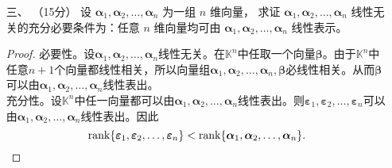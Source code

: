 \begin{enumerate}[1~]
\begin{proof}
\begin{align}
\begin{matrix}
\end{matrix} \right|\\
&=(x-y)D_{n-1}+y(x-z)^{n-1}\quad (n\ge 2).
\end{align}
由对称性，
\begin{equation}\label{Dn2}
D _ { n } = \left| A ^ { \prime } \right| = ( x - z ) D _ { n - 1 } + z ( x - y ) ^ { n - 1 } \quad ( n \ge 2 ).
\end{equation}
由 \eqref{Dn1} 和  \eqref{Dn2} 得，\[
D_n=\frac{y(x-z)^n-z(x-y)^n}{y-z}\quad (n\ge 2).
\]
容易验证上式在$n=1$时也成立。因此，\[
D_n=\frac{y(x-z)^n-z(x-y)^n}{y-z}.
\]
\end{proof}

\item[三、]（15分）
设 $\boldsymbol { \boldsymbol{\alpha} }_1, \boldsymbol { \boldsymbol{\alpha} }_2, \dots , \boldsymbol { \boldsymbol{\alpha} }_n$ 为一组 $n$ 维向量， 求证 $\boldsymbol { \boldsymbol{\alpha} }_1, \boldsymbol { \boldsymbol{\alpha} }_2, \dots ,\boldsymbol { \boldsymbol{\alpha} }_n$ 线性无关的充分必要条件为：任意 $n$ 维向量均可由 $\boldsymbol { \boldsymbol{\alpha} }_1, \boldsymbol { \boldsymbol{\alpha} }_2, \dots ,\boldsymbol { \boldsymbol{\alpha} }_n $ 线性表示。
\begin{proof}
必要性。设$\boldsymbol { \boldsymbol{\alpha} } _ { 1 } , \boldsymbol { \boldsymbol{\alpha} } _ { 2 } , \dots , \boldsymbol { \boldsymbol{\alpha} } _ { n }$线性无关。在$\mathbb{K}^n$中任取一个向量$\boldsymbol{\boldsymbol{\beta}}$。由于$\mathbb{K}^n$中任意$n+1$个向量都线性相关，所以向量组$\boldsymbol { \boldsymbol{\alpha} } _ { 1 } , \boldsymbol { \boldsymbol{\alpha} } _ { 2 } , \dots , \boldsymbol { \boldsymbol{\alpha} } _ { n } , \boldsymbol { \boldsymbol{\beta} }$必线性相关。从而$\boldsymbol { \boldsymbol{\beta} }$可以由$\boldsymbol { \boldsymbol{\alpha} } _ { 1 } , \boldsymbol { \boldsymbol{\alpha} } _ { 2 } , \dots , \boldsymbol { \boldsymbol{\alpha} } _ { n } $线性表出。\\
充分性。设$\mathbb{K}^n$中任一向量都可以由$\boldsymbol { \boldsymbol{\alpha} } _ { 1 } , \boldsymbol { \boldsymbol{\alpha} } _ { 2 } , \dots , \boldsymbol { \boldsymbol{\alpha} } _ { n } $线性表出。则$\boldsymbol{\varepsilon} _ { 1 } , \boldsymbol{\varepsilon} _ { 2 } , \dots , \boldsymbol{\varepsilon} _ { n }$可以由$\boldsymbol { \boldsymbol{\alpha} } _ { 1 } , \boldsymbol { \boldsymbol{\alpha} } _ { 2 } , \dots , \boldsymbol { \boldsymbol{\alpha} } _ { n } $线性表出。因此
\[
{\rm rank}\{\boldsymbol{\varepsilon} _ { 1 } , \boldsymbol{\varepsilon} _ { 2 } , \dots , \boldsymbol{\varepsilon} _ { n }\}< {\rm rank}\{\boldsymbol { \boldsymbol{\alpha} } _ { 1 } , \boldsymbol { \boldsymbol{\alpha} } _ { 2 } , \dots , \boldsymbol { \boldsymbol{\alpha} } _ { n } \}.
\]
\end{proof}
\end{enumerate}

